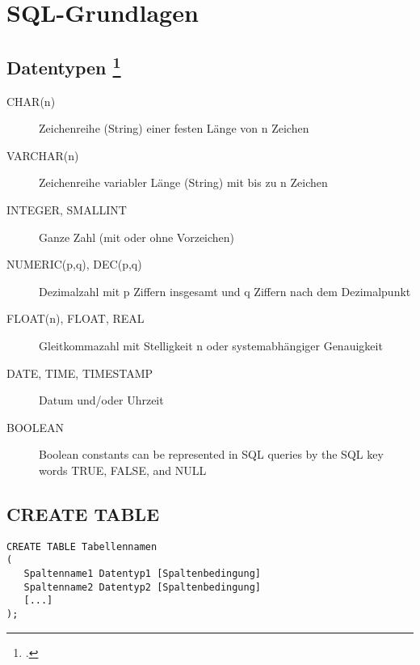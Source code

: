 \documentclass{lehramt-informatik-haupt}
\begin{document}

\chapter{SQL-Grundlagen}

%

\section{Datentypen
\footcite[Seite 132]{winter}}

\begin{description}
\item[CHAR(n)] Zeichenreihe (String) einer festen Länge von n Zeichen

\item[VARCHAR(n)] Zeichenreihe variabler Länge (String) mit bis zu n
Zeichen

\item[INTEGER, SMALLINT] Ganze Zahl (mit oder ohne Vorzeichen)

\item[NUMERIC(p,q), DEC(p,q)] Dezimalzahl mit p Ziffern insgesamt und q
Ziffern nach dem Dezimalpunkt

\item[FLOAT(n), FLOAT, REAL] Gleitkommazahl mit Stelligkeit n oder
systemabhängiger Genauigkeit

\item[DATE, TIME, TIMESTAMP] Datum und/oder Uhrzeit

\item[BOOLEAN] Boolean constants can be represented in SQL queries by
the SQL key words TRUE, FALSE, and NULL
\end{description}

\section{CREATE TABLE}

\begin{verbatim}
CREATE TABLE Tabellennamen
(
   Spaltenname1 Datentyp1 [Spaltenbedingung]
   Spaltenname2 Datentyp2 [Spaltenbedingung]
   [...]
);
\end{verbatim}
\end{document}

